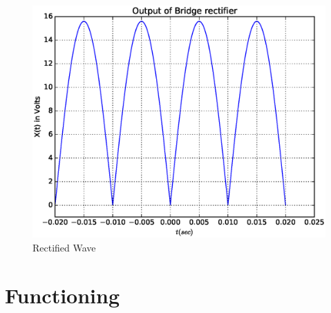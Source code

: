 \documentclass[journal,12pt,twocolumn]{IEEEtran}
\begin{document}

\begin{figure}[h]
\centering
	\includegraphics[scale=0.4]{./figs/sine.eps}
	\caption{Rectified Wave}  \label{fig2}
    \end{figure}

\section{Functioning}
\end{document}

